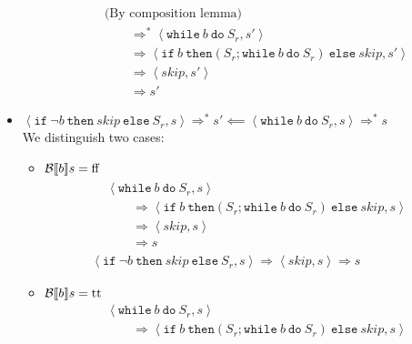 \begin{exercise}
\begin{itemize}
\begin{itemize}
\begin{align*}
                    \\&\text{(By composition lemma)}
                    \\&\qquad\Rightarrow^* \left<\texttt{while}\ b\ \texttt{do}\ S_r, s'\right>
                    \\&\qquad\Rightarrow \left<\texttt{if}\ b\ \texttt{then} (S_r; \texttt{while}\ b\ \texttt{do}\ S_r)\ \texttt{else}\ skip, s'\right>
                    \\&\qquad\Rightarrow \left<skip, s'\right>
                    \\&\qquad\Rightarrow s'
                \end{align*}
            \end{itemize}
        \item $\left<\texttt{if}\ \neg b\ \texttt{then}\ skip\ \texttt{else}\ S_r, s\right> \Rightarrow^* s' \impliedby \left<\texttt{while}\ b\ \texttt{do}\ S_r, s\right> \Rightarrow^* s$ \\
            We distinguish two cases:\begin{itemize}
                \item $\mathcal{B} \llbracket  b \rrbracket s = \text{ff}$
                \begin{gather*}
                    \begin{align*}
                        &\left<\texttt{while}\ b\ \texttt{do}\ S_r, s\right>
                        \\&\qquad\Rightarrow \left<\texttt{if}\ b\ \texttt{then} (S_r; \texttt{while}\ b\ \texttt{do}\ S_r)\ \texttt{else}\ skip, s\right>
                        \\&\qquad\Rightarrow \left<skip, s\right>
                        \\&\qquad\Rightarrow s
                    \end{align*}
                    \\
                    \left<\texttt{if}\ \neg b\ \texttt{then}\ skip\ \texttt{else}\ S_r, s\right>
                    \Rightarrow
                    \left<skip, s\right>
                    \Rightarrow s
                \end{gather*}
                \item $\mathcal{B} \llbracket  b \rrbracket s = \text{tt}$
                \begin{align*}
                    &\left<\texttt{while}\ b\ \texttt{do}\ S_r, s\right>
                    \\&\qquad\Rightarrow \left<\texttt{if}\ b\ \texttt{then} (S_r; \texttt{while}\ b\ \texttt{do}\ S_r)\ \texttt{else}\ skip, s\right>

\end{align*}
\end{itemize}
\end{itemize}
\end{exercise}
